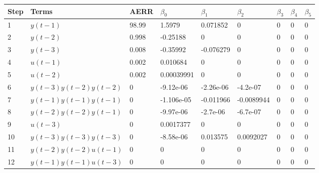 \begin{tabular}{lllllllll}
Step & Terms & AERR & $\beta_{0}$ & $\beta_{1}$ & $\beta_{2}$ & $\beta_{3}$ & $\beta_{4}$ & $\beta_{5}$ \\ 
\hline 
1 & $y(t-1)$ & 98.99 & 1.5979 & 0.071852 & 0 & 0 & 0 & 0 \\ 
2 & $y(t-2)$ & 0.998 & -0.25188 & 0 & 0 & 0 & 0 & 0 \\ 
3 & $y(t-3)$ & 0.008 & -0.35992 & -0.076279 & 0 & 0 & 0 & 0 \\ 
4 & $u(t-1)$ & 0.002 & 0.010684 & 0 & 0 & 0 & 0 & 0 \\ 
5 & $u(t-2)$ & 0.002 & 0.00039991 & 0 & 0 & 0 & 0 & 0 \\ 
6 & $y(t-3)y(t-2)y(t-2)$ & 0 & -9.12e-06 & -2.26e-06 & -4.2e-07 & 0 & 0 & 0 \\ 
7 & $y(t-1)y(t-1)y(t-1)$ & 0 & -1.106e-05 & -0.011966 & -0.0089944 & 0 & 0 & 0 \\ 
8 & $y(t-2)y(t-2)y(t-1)$ & 0 & -9.97e-06 & -2.7e-06 & -6.7e-07 & 0 & 0 & 0 \\ 
9 & $u(t-3)$ & 0 & 0.0017377 & 0 & 0 & 0 & 0 & 0 \\ 
10 & $y(t-3)y(t-3)y(t-3)$ & 0 & -8.58e-06 & 0.013575 & 0.0092027 & 0 & 0 & 0 \\ 
11 & $y(t-2)y(t-2)u(t-1)$ & 0 & 0 & 0 & 0 & 0 & 0 & 0 \\ 
12 & $y(t-1)y(t-1)u(t-3)$ & 0 & 0 & 0 & 0 & 0 & 0 & 0 \\ 
\hline 
\end{tabular}